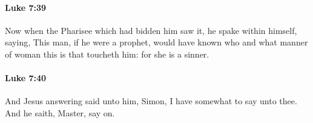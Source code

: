 		\paragraph{Luke 7:39} %
			\label{LUKE-7-39}

			Now when the Pharisee which had bidden him saw it, he spake within himself, saying, This man, if he were a prophet, would have known who and what manner of woman this is that toucheth him: for she is a sinner.

			\begin{framed}
			\scriptsize
				\begin{compactdesc}
					\item[SBLG] 
				\end{compactdesc}
			\end{framed}

		\paragraph{Luke 7:40} %
			\label{LUKE-7-40}

			And Jesus answering said unto him, Simon, I have somewhat to say unto thee. And he saith, Master, say on.

